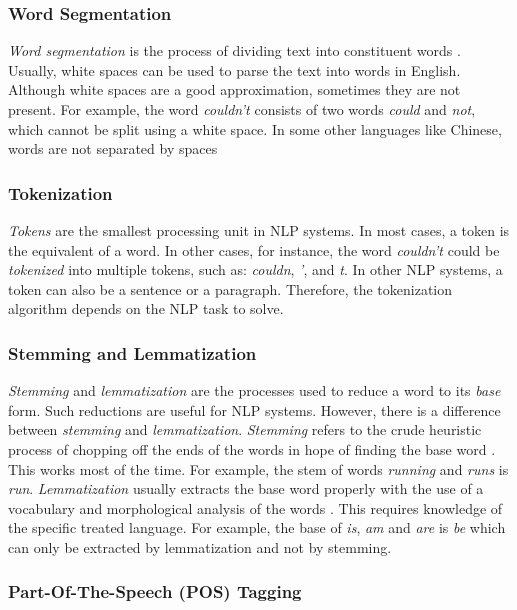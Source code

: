 \subsubsection{Word Segmentation}

\textit{Word segmentation} is the process of dividing text into constituent words \cite{wiki:sentSeg}. Usually, white spaces can be used to parse the text into words in English. Although white spaces are a good approximation, sometimes they are not present. For example, the word \textit{couldn't} consists of two words \textit{could} and \textit{not}, which cannot be split using a white space. In some other languages like Chinese, words are not separated by spaces

\subsubsection{Tokenization}

\textit{Tokens} are the smallest processing unit in NLP systems. In most cases, a token is the equivalent of a word. In other cases, for instance, the word \textit{couldn't} could be \emph{tokenized} into multiple tokens, such as: \textit{couldn}, \textit{'}, and \textit{t}. In other NLP systems, a token can also be a sentence or a paragraph. Therefore, the tokenization algorithm depends on the NLP task to solve.

\subsubsection{Stemming and Lemmatization}

\textit{Stemming} and \textit{lemmatization} are the processes used to reduce a word to its \textit{base} form. Such reductions are useful for NLP systems. However, there is a difference between \textit{stemming} and \textit{lemmatization}. \textit{Stemming} refers to the crude heuristic process of chopping off the ends of the words in hope of finding the base word \cite{stemminglemmatization}. This works most of the time. For example, the stem of words \textit{running} and \textit{runs} is \textit{run}. \textit{Lemmatization} usually extracts the base word properly with the use of a vocabulary and morphological analysis of the words \cite{stemminglemmatization}.  This requires knowledge of the specific treated language. For example, the base of \textit{is}, \textit{am} and \textit{are} is \textit{be} which can only be extracted by lemmatization and not by stemming.

\subsubsection{Part-Of-The-Speech (POS) Tagging}

